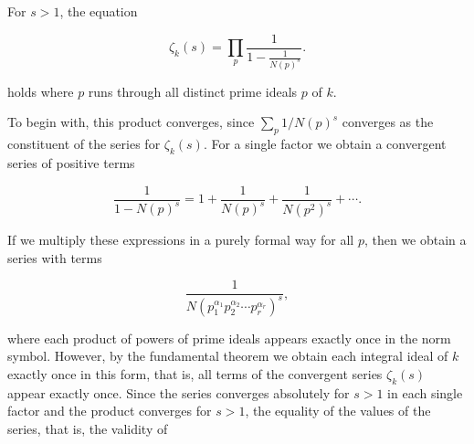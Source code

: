 For $s > 1$, the equation

$$\zeta_k(s) = \prod_p \frac{1}{1 - \frac{1}{N(p)^s}}.$$

holds where $p$ runs through all distinct prime ideals $p$ of $k$.

To begin with, this product converges, since $\sum_p 1/N(p)^s$ converges as the constituent of the series for $\zeta_k(s)$. For a single factor we obtain a convergent series of positive terms

$$\frac{1}{1 - N(p)^s} = 1 + \frac{1}{N(p)^s} + \frac{1}{N(p^2)^s} + \cdots.$$

If we multiply these expressions in a purely formal way for all $p$, then we obtain a series with terms

$$\frac{1}{N(p_1^{\alpha_1} p_2^{\alpha_2} \cdots p_r^{\alpha_r})^s},$$

where each product of powers of prime ideals appears exactly once in the norm symbol. However, by the fundamental theorem we obtain each integral ideal of $k$ exactly once in this form, that is, all terms of the convergent series $\zeta_k(s)$ appear exactly once. Since the series converges absolutely for $s > 1$ in each single factor and the product converges for $s > 1$, the equality of the values of the series, that is, the validity of
